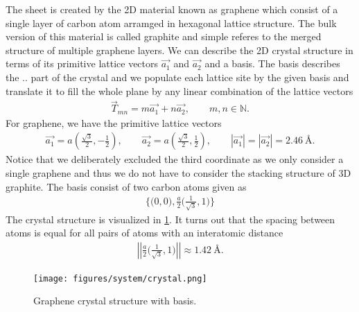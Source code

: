 The sheet is created by the 2D material known as graphene which consist of a single layer of carbon atom arramged in hexagonal lattice structure. The bulk version of this material is called graphite and simple referes to the merged structure of multiple graphene layers. We can describe the 2D crystal structure in terms of its primitive lattice vectors $\vec{a_1}$ and $\vec{a_2}$ and a basis. The basis describes the .. part of the crystal and we populate each lattice site by the given basis and translate it to fill the whole plane by any linear combination of the lattice vectors 
\begin{align*}
  \vec{T}_{mn} = m\vec{a_1} + n\vec{a_2}, \qquad m,n \in \mathbb{N}.
\end{align*}
For graphene, we have the primitive lattice vectors 
\begin{align*}
  \vec{a_1} = a \left(\frac{\sqrt{3}}{2}, -\frac{1}{2}\right), \qquad \vec{a_2} = a \left(\frac{\sqrt{3}}{2}, \frac{1}{2}\right), \qquad |\vec{a_1}| = |\vec{a_2}| = 2.46 \ \text{Å}.
\end{align*}
Notice that we deliberately excluded the third coordinate as we only consider a
single graphene and thus we do not have to consider the stacking structure of 3D graphite. The basis consist of two carbon atoms given as 
\begin{align*}
  \Big\{\Big(0,0\Big), \frac{a}{2}\Big(\frac{1}{\sqrt{3}}, 1 \Big) \Big\}
\end{align*}
The crystal structure is visualized in \cref{fig:graphene_crystal}. It turns out that the spacing between atoms is equal for all pairs of atoms with an interatomic distance
\begin{align*}
  \left|\left|\frac{a}{2}\Big(\frac{1}{\sqrt{3}}, 1 \Big)\right|\right| \approx 1.42 \ \text{Å}.
\end{align*}


\begin{figure}[H]
  \centering
  \texttt{[image: figures/system/crystal.png]}
  \caption{Graphene crystal structure with basis.}
  \label{fig:graphene_crystal}
\end{figure}



